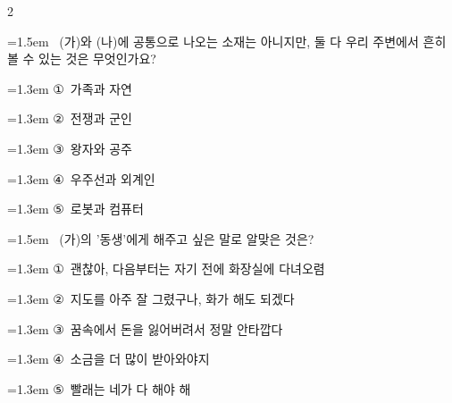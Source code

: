 \documentclass[12pt, a4paper]{article}
\begin{document}
\begin{multicols}{2}
\noindent\begin{minipage}{\columnwidth}
\vspace{2mm}
{\hangindent=1.5em  ~(가)와 (나)에 공통으로 나오는 소재는 아니지만, 둘 다 우리 주변에서 흔히 볼 수 있는 것은 무엇인가요?\par}

\vspace{0.5mm}
{\hangindent=1.3em  \noindent\hspace{0.3em}①~가족과 자연\par}
{\hangindent=1.3em  \noindent\hspace{0.3em}②~전쟁과 군인\par}
{\hangindent=1.3em  \noindent\hspace{0.3em}③~왕자와 공주\par}
{\hangindent=1.3em  \noindent\hspace{0.3em}④~우주선과 외계인\par}
{\hangindent=1.3em  \noindent\hspace{0.3em}⑤~로봇과 컴퓨터\par}
\vspace{4mm}
\end{minipage}
\par

\noindent\begin{minipage}{\columnwidth}
\vspace{2mm}
{\hangindent=1.5em  ~(가)의 '동생'에게 해주고 싶은 말로 알맞은 것은?\par}

\vspace{0.5mm}
{\hangindent=1.3em  \noindent\hspace{0.3em}①~괜찮아, 다음부터는 자기 전에 화장실에 다녀오렴\par}
{\hangindent=1.3em  \noindent\hspace{0.3em}②~지도를 아주 잘 그렸구나, 화가 해도 되겠다\par}
{\hangindent=1.3em  \noindent\hspace{0.3em}③~꿈속에서 돈을 잃어버려서 정말 안타깝다\par}
{\hangindent=1.3em  \noindent\hspace{0.3em}④~소금을 더 많이 받아와야지\par}
{\hangindent=1.3em  \noindent\hspace{0.3em}⑤~빨래는 네가 다 해야 해\par}
\vspace{4mm}
\end{minipage}
\par


\end{multicols}
\end{document}
